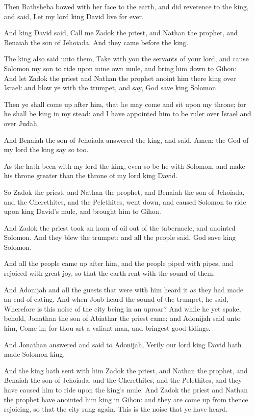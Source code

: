 \verse Then Bathsheba bowed with her face to the earth, and did reverence to the king, and said, Let my lord king David live for ever.

\verse And king David said, Call me Zadok the priest, and Nathan the prophet, and Benaiah the son of Jehoiada. And they came before the king.

\verse The king also said unto them, Take with you the servants of your lord, and cause Solomon my son to ride upon mine own mule, and bring him down to Gihon: \verse And let Zadok the priest and Nathan the prophet anoint him there king over Israel: and blow ye with the trumpet, and say, God save king Solomon.

\verse Then ye shall come up after him, that he may come and sit upon my throne; for he shall be king in my stead: and I have appointed him to be ruler over Israel and over Judah.

\verse And Benaiah the son of Jehoiada answered the king, and said, Amen: the \LORD God of my lord the king say so too.

\verse As the \LORD hath been with my lord the king, even so be he with Solomon, and make his throne greater than the throne of my lord king David.

\verse So Zadok the priest, and Nathan the prophet, and Benaiah the son of Jehoiada, and the Cherethites, and the Pelethites, went down, and caused Solomon to ride upon king David's mule, and brought him to Gihon.

\verse And Zadok the priest took an horn of oil out of the tabernacle, and anointed Solomon. And they blew the trumpet; and all the people said, God save king Solomon.

\verse And all the people came up after him, and the people piped with pipes, and rejoiced with great joy, so that the earth rent with the sound of them.

\verse And Adonijah and all the guests that were with him heard it as they had made an end of eating. And when Joab heard the sound of the trumpet, he said, Wherefore is this noise of the city being in an uproar?  \verse And while he yet spake, behold, Jonathan the son of Abiathar the priest came; and Adonijah said unto him, Come in; for thou art a valiant man, and bringest good tidings.

\verse And Jonathan answered and said to Adonijah, Verily our lord king David hath made Solomon king.

\verse And the king hath sent with him Zadok the priest, and Nathan the prophet, and Benaiah the son of Jehoiada, and the Cherethites, and the Pelethites, and they have caused him to ride upon the king's mule: \verse And Zadok the priest and Nathan the prophet have anointed him king in Gihon: and they are come up from thence rejoicing, so that the city rang again. This is the noise that ye have heard.

